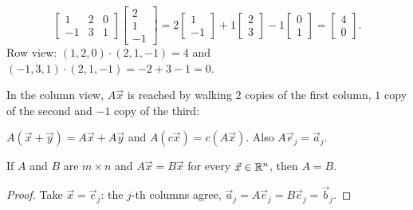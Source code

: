 \begin{example}
\[
\begin{bmatrix} 1&2&0\\-1&3&1\end{bmatrix}\begin{bmatrix}2\\1\\-1\end{bmatrix}
= 2\begin{bmatrix}1\\-1\end{bmatrix}+1\begin{bmatrix}2\\3\end{bmatrix}-1\begin{bmatrix}0\\1\end{bmatrix}
=\begin{bmatrix}4\\0\end{bmatrix}.
\]
Row view: $(1,2,0)\cdot(2,1,-1)=4$ and $(-1,3,1)\cdot(2,1,-1)=-2+3-1=0$.
\end{example}

In the column view, $A\vec x$ is reached by walking $2$ copies of the first column, $1$ copy of
the second and $-1$ copy of the third:
\begin{center}
\end{center}

\begin{theorem}[Linearity]
$A(\vec x+\vec y)=A\vec x+A\vec y$ and $A(c\vec x)=c(A\vec x)$. Also $A\vec e_j=\vec a_j$.
\end{theorem}

\begin{theorem}
If $A$ and $B$ are $m\times n$ and $A\vec x=B\vec x$ for every $\vec x\in\mathbb{R}^n$, then $A=B$.
\end{theorem}
\begin{proof}
Take $\vec x=\vec e_j$: the $j$-th columns agree, $\vec a_j=A\vec e_j=B\vec e_j=\vec b_j$.
\end{proof}

